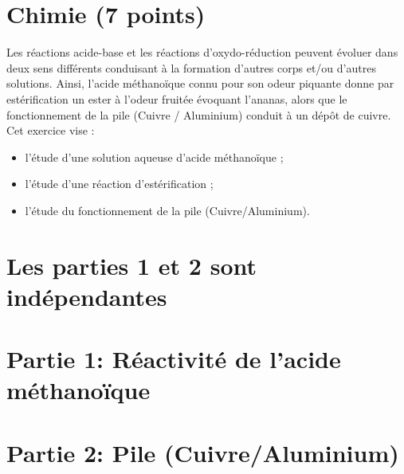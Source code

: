 \section*{Chimie (7 points)}
Les réactions acide-base et les réactions d'oxydo-réduction peuvent évoluer dans deux sens différents conduisant à la formation d'autres corps et/ou d'autres solutions. Ainsi, l'acide méthanoïque connu pour son odeur piquante donne par estérification un ester à l'odeur fruitée évoquant l'ananas, alors que le fonctionnement de la pile (Cuivre / Aluminium) conduit à un dépôt de cuivre.\\
Cet exercice vise :

\begin{itemize}
  \item l'étude d'une solution aqueuse d'acide méthanoïque ;
  \item l'étude d'une réaction d'estérification ;
  \item l'étude du fonctionnement de la pile (Cuivre/Aluminium).
\end{itemize}

\section*{Les parties 1 et 2 sont indépendantes}
\section*{Partie 1: Réactivité de l'acide méthanoïque}


\section*{Partie 2: Pile (Cuivre/Aluminium)}

